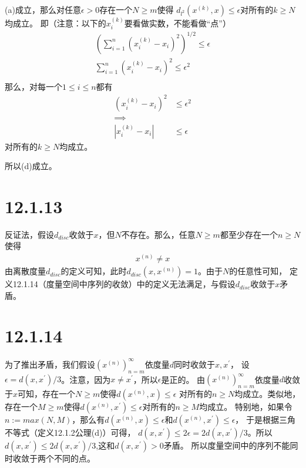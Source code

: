 \documentclass{article}
\begin{document}
\begin{itemize}
            (a)成立，那么对任意$\epsilon > 0$存在一个$N \geq m$使得
            $d_{l^2}(x^{(k)}, x) \leq \epsilon$对所有的$k \geq N$均成立。
            即（注意：以下的$x_i^{(k)}$要看做实数，不能看做“点”）
            \begin{align*}
                  \left( \sum \limits_{i = 1}^n (x_i^{(k)} - x_i)^2 \right)^{1/2} \leq \epsilon \\
                  \sum \limits_{i = 1}^n (x_i^{(k)} - x_i)^2 \leq \epsilon^2                    \\
            \end{align*}
            那么，对每一个$1 \leq i \leq n$都有
            \begin{align*}
                  (x_i^{(k)} - x_i)^2 & \leq \epsilon^2 \\
                  \implies                              \\
                  |x_i^{(k)} - x_i|   & \leq \epsilon
            \end{align*}
            对所有的$k \geq N$均成立。

            所以(d)成立。

\end{itemize}

\section*{12.1.13}

反证法，假设$d_{disc}$收敛于$x$，但$N$不存在。那么，任意$N \geq m$都至少存在一个$n \geq N$使得
\begin{align*}
      x^{(n)} \neq x
\end{align*}
由离散度量$d_{disc}$的定义可知，此时$d_{disc}(x, x^{(n)}) = 1$。由于$N$的任意性可知，
定义12.1.14（度量空间中序列的收敛）中的定义无法满足，与假设$d_{disc}$收敛于$x$矛盾。

\section*{12.1.14}

为了推出矛盾，我们假设$(x^{(n)})_{n = m}^\infty$依度量$d$同时收敛于$x, x^\prime$，
设$\epsilon = d(x, x^\prime)/3$。注意，因为$x \neq x^\prime$，所以$\epsilon$是正的。
由$(x^{(n)})_{n = m}^\infty$依度量$d$收敛于$x$可知，存在一个$N \geq m$使得$d(x^{(n)}, x) \leq \epsilon$
对所有的$n \geq N$均成立。类似地，存在一个$M \geq m$使得$d(x^{(n)}, x^\prime) \leq \epsilon$对所有的$n \geq M$均成立。
特别地，如果令$n := max(N, M)$，那么有$d(x^{(n)}, x) \leq \epsilon$和$d(x^{(n)}, x^\prime) \leq \epsilon$，
于是根据三角不等式（定义12.1.2公理(d)）可得，
$d(x, x^\prime) \leq 2\epsilon = 2d(x, x^\prime)/3$。所以$d(x, x^\prime) \leq 2d(x, x^\prime)/3$,这和$d(x, x^\prime) > 0$矛盾。
所以度量空间中的序列不能同时收敛于两个不同的点。
\end{document}
